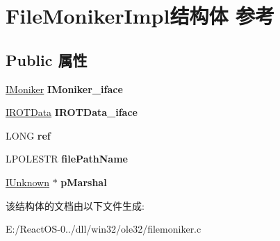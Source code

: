 \hypertarget{struct_file_moniker_impl}{}\section{File\+Moniker\+Impl结构体 参考}
\label{struct_file_moniker_impl}
\subsection*{Public 属性}
\begin{DoxyCompactItemize}
\item 
\mbox{\label{struct_file_moniker_impl_a6304758b7c8c4d9e57ad14acc361b9b5}} 
\hyperlink{interface_i_moniker}{I\+Moniker} {\bfseries I\+Moniker\+\_\+iface}
\item 
\mbox{\label{struct_file_moniker_impl_a650cc88810382a1c8103918e375a8278}} 
\hyperlink{interface_i_r_o_t_data}{I\+R\+O\+T\+Data} {\bfseries I\+R\+O\+T\+Data\+\_\+iface}
\item 
\mbox{\label{struct_file_moniker_impl_a69fcf80b106089333df58e03b9cb2150}} 
L\+O\+NG {\bfseries ref}
\item 
\mbox{\label{struct_file_moniker_impl_a15edd268daf44577d38ead78b20b593f}} 
L\+P\+O\+L\+E\+S\+TR {\bfseries file\+Path\+Name}
\item 
\mbox{\label{struct_file_moniker_impl_a6011c73e51b220fb6ba1fa4f907cb2c3}} 
\hyperlink{interface_i_unknown}{I\+Unknown} $\ast$ {\bfseries p\+Marshal}
\end{DoxyCompactItemize}


该结构体的文档由以下文件生成\+:\begin{DoxyCompactItemize}
\item 
E\+:/\+React\+O\+S-\/0../dll/win32/ole32/filemoniker.\+c\end{DoxyCompactItemize}

